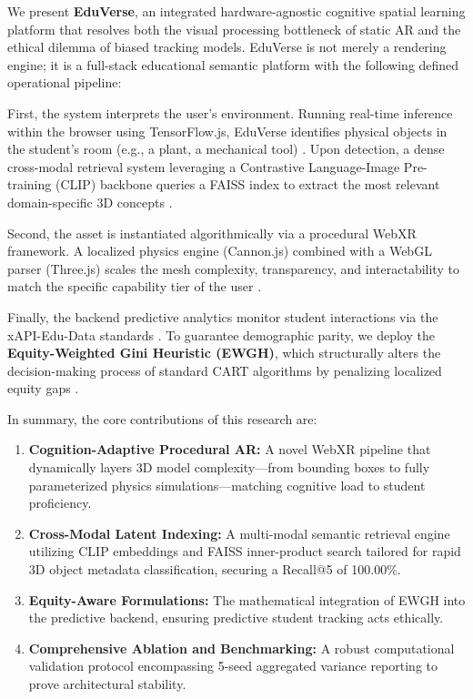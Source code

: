 \documentclass[conference]{IEEEtran}
\begin{document}
We present \textbf{EduVerse}, an integrated hardware-agnostic cognitive spatial learning platform that resolves both the visual processing bottleneck of static AR and the ethical dilemma of biased tracking models. EduVerse is not merely a rendering engine; it is a full-stack educational semantic platform with the following defined operational pipeline:

First, the system interprets the user's environment. Running real-time inference within the browser using TensorFlow.js, EduVerse identifies physical objects in the student's room (e.g., a plant, a mechanical tool) \cite{garcia2024tensor}. Upon detection, a dense cross-modal retrieval system leveraging a Contrastive Language-Image Pre-training (CLIP) backbone queries a FAISS index to extract the most relevant domain-specific 3D concepts \cite{liu2021clipretrieval}.

Second, the asset is instantiated algorithmically via a procedural WebXR framework. A localized physics engine (Cannon.js) combined with a WebGL parser (Three.js) scales the mesh complexity, transparency, and interactability to match the specific capability tier of the user \cite{hassan2022threejs}.

Finally, the backend predictive analytics monitor student interactions via the xAPI-Edu-Data standards \cite{miller2021predictive}. To guarantee demographic parity, we deploy the \textbf{Equity-Weighted Gini Heuristic (EWGH)}, which structurally alters the decision-making process of standard CART algorithms by penalizing localized equity gaps \cite{davis2023equity}.

In summary, the core contributions of this research are:
\begin{enumerate}
    \item \textbf{Cognition-Adaptive Procedural AR:} A novel WebXR pipeline that dynamically layers 3D model complexity—from bounding boxes to fully parameterized physics simulations—matching cognitive load to student proficiency.
    \item \textbf{Cross-Modal Latent Indexing:} A multi-modal semantic retrieval engine utilizing CLIP embeddings and FAISS inner-product search tailored for rapid 3D object metadata classification, securing a Recall@5 of 100.00\%.
    \item \textbf{Equity-Aware Formulations:} The mathematical integration of EWGH into the predictive backend, ensuring predictive student tracking acts ethically.
    \item \textbf{Comprehensive Ablation and Benchmarking:} A robust computational validation protocol encompassing 5-seed aggregated variance reporting to prove architectural stability.
\end{enumerate}
\end{document}
